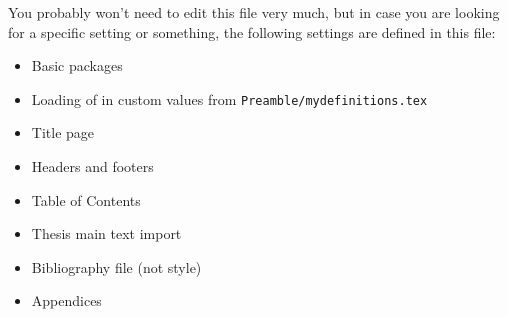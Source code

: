 You probably won't need to edit this file very much, but in case you are
looking for a specific setting or something, the following settings are
defined in this file:
\begin{itemize}
    \item Basic packages
    \item Loading of in custom values from \texttt{Preamble/mydefinitions.tex}
    \item Title page
    \item Headers and footers
    \item Table of Contents
    \item Thesis main text import
    \item Bibliography file (not style)
    \item Appendices
\end{itemize}
